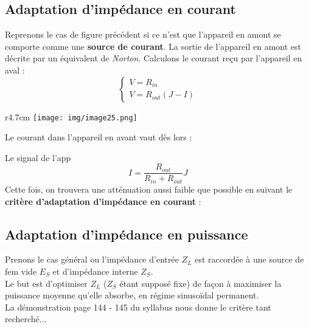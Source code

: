 \documentclass[11pt, a4paper, openany]{book}
\begin{document}
		
		\subsection{Adaptation d'impédance en courant}
		Reprenons le cas de figure précédent si ce n'est que l'appareil en amont se comporte comme une \textbf{source de courant}. La sortie de l'appareil en amont est décrite par un équivalent de \textit{Norton}. Calculons le courant reçu  par l'appareil en aval :
		\begin{equation}
		\left\{\begin{array}{l}
		V = R_{in}\\
		V = R_{out}(J-I)
		\end{array}\right.
		\end{equation}
		\begin{wrapfigure}[6]{r}{4.7cm}
			\texttt{[image: img/image25.png]}
		\end{wrapfigure}
		Le courant dans l'appareil en avant vaut dès lors :
		
		Le signal de l'app
		\begin{equation}
		I = \frac{R_{out}}{R_{in} + R_{out}}J
		\end{equation}
		Cette fois, on trouvera une atténuation aussi faible que possible en suivant le \textbf{critère d'adaptation d'impédance en courant} :\\
		
		
		\subsection{Adaptation d'impédance en puissance}
		Prenons le cas général ou l'impédance d'entrée $Z_L$ est raccordée à une source de fem vide \underline{$E_S$} et d'impédance interne $Z_S$.\\
		Le but est d'optimiser $Z_L$ ($Z_S$ étant supposé fixe) de façon à maximiser la puissance moyenne qu'elle absorbe, en régime sinusoïdal permanent.\\
		La démonstration page 144 - 145 du syllabus nous donne le critère tant recherché...\\
		
		
\end{document}
